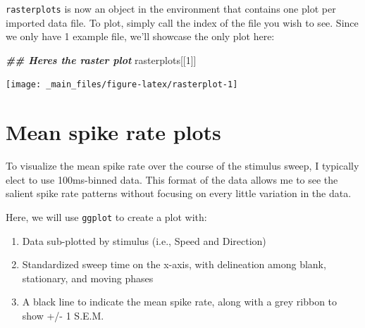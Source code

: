 \documentclass[
]{book}
\newenvironment{Shaded}{\begin{snugshade}}{\end{snugshade}}
\newcommand{\DecValTok}[1]{\textcolor[rgb]{0.00,0.00,0.81}{#1}}
\newcommand{\DocumentationTok}[1]{\textcolor[rgb]{0.56,0.35,0.01}{\textbf{\textit{#1}}}}
\newcommand{\NormalTok}[1]{#1}
\providecommand{\tightlist}{%
  \setlength{\itemsep}{0pt}\setlength{\parskip}{0pt}}
\begin{document}
\texttt{rasterplots} is now an object in the environment that contains one plot
per imported data file. To plot, simply call the index of the file you
wish to see. Since we only have 1 example file, we'll showcase the only
plot here:

\begin{Shaded}
\begin{Highlighting}[]
\DocumentationTok{\#\# Here\textquotesingle{}s the raster plot}
\NormalTok{rasterplots[[}\DecValTok{1}\NormalTok{]]}
\end{Highlighting}
\end{Shaded}

\texttt{[image: \_main\_files/figure-latex/rasterplot-1]}

\hypertarget{mean-spike-rate-plots}{%
\section{Mean spike rate plots}\label{mean-spike-rate-plots}}

To visualize the mean spike rate over the course of the stimulus
sweep, I typically elect to use 100ms-binned data. This format of the
data allows me to see the salient spike rate patterns without focusing
on every little variation in the data.

Here, we will use \texttt{ggplot} to create a plot with:

\begin{enumerate}
\def\labelenumi{\arabic{enumi}.}
\tightlist
\item
  Data sub-plotted by stimulus (i.e., Speed and Direction)
\item
  Standardized sweep time on the x-axis, with delineation among
  blank, stationary, and moving phases
\item
  A black line to indicate the mean spike rate, along with a grey
  ribbon to show +/- 1 S.E.M.
\end{enumerate}
\end{document}
